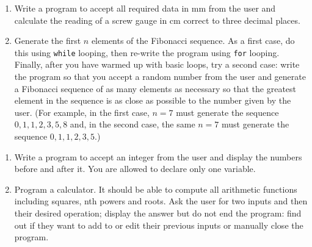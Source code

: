 \documentclass{article}
\begin{document}
\begin{enumerate}
\item Write a program to accept all required data in mm from the user and calculate the reading of a screw gauge in cm correct to three decimal places.
\item Generate the first $n$ elements of the Fibonacci sequence. As a first case, do this using \verb+while+ looping, then re-write the program using \verb+for+ looping. Finally, after you have warmed up with basic loops, try a second case: write the program so that you accept a random number from the user and generate a Fibonacci sequence of as many elements as necessary so that the greatest element in the sequence is as close as possible to the number given by the user. (For example, in the first case, $n=7$ must generate the sequence ${ 0, 1, 1, 2, 3, 5, 8 }$ and, in the second case, the same $n=7$ must generate the sequence ${ 0, 1, 1, 2, 3, 5 }$.)
\end{enumerate}
\vspace{5ex}


\begin{enumerate}
\item Write a program to accept an integer from the user and display the numbers before and after it. You are allowed to declare only one variable. \label{ex:increment-decrement}
\item Program a calculator. It should be able to compute all arithmetic functions including squares, nth powers and roots. Ask the user for two inputs and then their desired operation; display the answer but do not end the program: find out if they want to add to or edit their previous inputs or manually close the program.
\end{enumerate}
\vspace{5ex}
\end{document}
